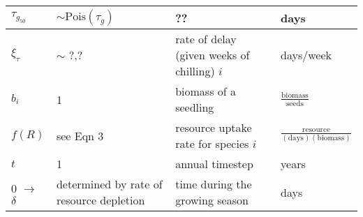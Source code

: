 \documentclass[11pt,letter]{article}
\begin{document}
\begin{center}
\begin{table}[h!]
\begin{tabular}{ | p{2.0cm} | p{3.5cm} | p{5.0cm} | p{4.0cm} |}
\(\tau_{g_{50}}\) & $\sim \mathrm{Pois}(\tau_{g})$ & ?? & days \\ \hline
\(\xi_{\tau}\) & $\sim$ ?,? & rate of delay (given weeks of chilling) \(i\) & days/week \\ \hline
\hline
\(b_{i}\) & 1 & biomass of a seedling & \(\frac{\text{biomass}}{\text{seeds}}\) \\ \hline
\(f(R)\) & see Eqn 3& resource uptake rate for species \(i\) & \(\frac{\text{resource}}{(\text{days})(\text{biomass})}\)\\ \hline
 \hline
\(t\) & 1 & annual timestep & years \\ \hline
\(0\) $\rightarrow$ \(\delta\) & determined by rate of resource depletion & time during the growing season & days \\ \hline
\hline
\end{tabular}
\label{tab:model}
\end{table}
\end{center}
\end{document}

